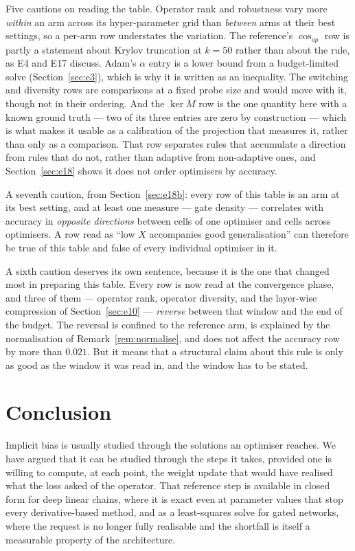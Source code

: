 \documentclass{article} %
\theoremstyle{plain}
\theoremstyle{definition}
\theoremstyle{remark}
\begin{document}
Five cautions on reading the table. Operator rank and robustness vary more \emph{within} an arm
across its hyper-parameter grid than \emph{between} arms at their best settings, so a per-arm row
understates the variation. The reference's $\cos_{op}$ row is partly a statement about Krylov
truncation at $k = 50$ rather than about the rule, as E4 and E17 discuss. Adam's $\alpha$ entry is
a lower bound from a budget-limited solve (Section~\ref{sec:e3}), which is why it is written as an
inequality. The switching and diversity rows are comparisons at a fixed probe size and would move
with it, though not in their ordering. And the $\ker M$ row is the one quantity here with a known
ground truth --- two of its three entries are zero by construction --- which is what makes it
usable as a calibration of the projection that measures it, rather than only as a comparison. That
row separates rules that accumulate a direction from rules that do not, rather than adaptive from
non-adaptive ones, and Section~\ref{sec:e18} shows it does not order optimisers by accuracy.

A seventh caution, from Section~\ref{sec:e18b}: every row of this table is an arm at its best
setting, and at least one measure --- gate density --- correlates with accuracy in \emph{opposite
directions} between cells of one optimiser and cells across optimisers. A row read as ``low $X$
accompanies good generalisation'' can therefore be true of this table and false of every individual
optimiser in it.

A sixth caution deserves its own sentence, because it is the one that changed most in preparing
this table. Every row is now read at the convergence phase, and three of them --- operator rank,
operator diversity, and the layer-wise compression of Section~\ref{sec:e10} --- \emph{reverse}
between that window and the end of the budget. The reversal is confined to the reference arm, is
explained by the normalisation of Remark~\ref{rem:normalise}, and does not affect the accuracy row
by more than $0.021$. But it means that a structural claim about this rule is only as good as the
window it was read in, and the window has to be stated.

\section{Conclusion}
\label{sec:conclusion}

Implicit bias is usually studied through the solutions an optimiser reaches. We have argued that it
can be studied through the steps it takes, provided one is willing to compute, at each point, the
weight update that would have realised what the loss asked of the operator. That reference step is
available in closed form for deep linear chains, where it is exact even at parameter values that
stop every derivative-based method, and as a least-squares solve for gated networks, where the
request is no longer fully realisable and the shortfall is itself a measurable property of the
architecture.
\end{document}
